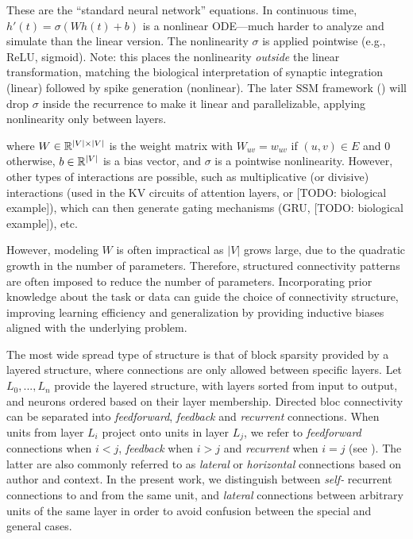 \begin{ThomasAnnotation}
These are the ``standard neural network'' equations. In continuous time, $h'(t) = \sigma(Wh(t)+b)$ is a nonlinear ODE---much harder to analyze and simulate than the linear version. The nonlinearity $\sigma$ is applied pointwise (e.g., ReLU, sigmoid). Note: this places the nonlinearity \emph{outside} the linear transformation, matching the biological interpretation of synaptic integration (linear) followed by spike generation (nonlinear). The later SSM framework () will drop $\sigma$ inside the recurrence to make it linear and parallelizable, applying nonlinearity only between layers.
\end{ThomasAnnotation}

where $W \in \mathbb{R}^{|V| \times |V|}$ is the weight matrix with $W_{uv} = w_{uv}$ if $(u,v) \in E$ and $0$ otherwise, $b \in \mathbb{R}^{|V|}$ is a bias vector, and $\sigma$ is a pointwise nonlinearity. However, other types of interactions are possible, such as multiplicative (or divisive) interactions (used in the KV circuits of attention layers, or [TODO: biological example]), which can then generate gating mechanisms (GRU, [TODO: biological example]), etc.

However, modeling $W$ is often impractical as $|V|$ grows large, due to the quadratic growth in the number of parameters. Therefore, structured connectivity patterns are often imposed to reduce the number of parameters. Incorporating prior knowledge about the task or data can guide the choice of connectivity structure, improving learning efficiency and generalization by providing inductive biases aligned with the underlying problem.

The most wide spread type of structure is that of block sparsity provided by a layered structure, where connections are only allowed between specific layers. Let $L_0, ..., L_n$ provide the layered structure, with layers sorted from input to output, and neurons ordered based on their layer membership.
Directed bloc connectivity can be separated into \emph{feedforward}, \emph{feedback} and \emph{recurrent} connections. When units from layer $L_i$ project onto units in layer $L_j$, we refer to \emph{feedforward} connections when $i < j$, \emph{feedback} when $i > j$ and \emph{recurrent} when $i=j$ (see ). The latter are also commonly referred to as \emph{lateral} or \emph{horizontal} connections based on author and context. In the present work, we distinguish between \emph{self-} recurrent connections to and from the same unit, and \emph{lateral} connections between arbitrary units of the same layer in order to avoid confusion between the special and general cases.

